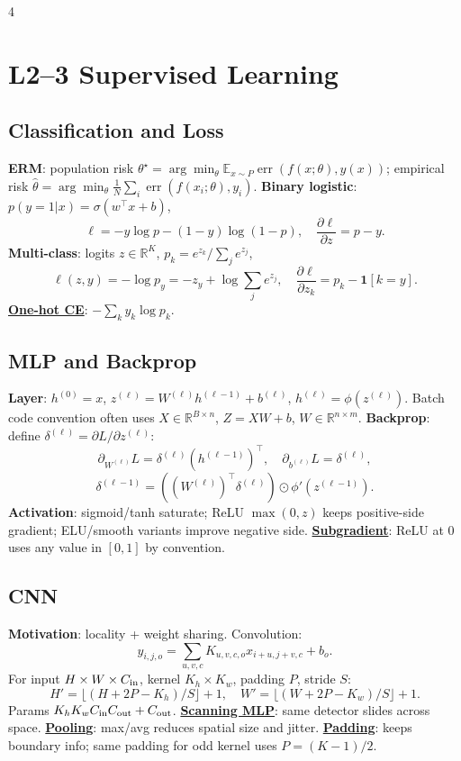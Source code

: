\documentclass{article}
\newcommand{\key}[1]{\textbf{#1}}
\newcommand{\lowterm}[1]{\textbf{\underline{#1}}}
\newcommand{\R}{\mathbb{R}}
\newcommand{\E}{\mathbb{E}}
\newcommand{\1}{\mathbf 1}
\begin{document}
\tiny
\begin{multicols*}{4}

\section{L2--3 Supervised Learning}
\subsection{Classification and Loss}
\key{ERM}: population risk $\theta^\star=\arg\min_\theta\E_{x\sim P}\operatorname{err}(f(x;\theta),y(x))$; empirical risk $\hat\theta=\arg\min_\theta\frac1N\sum_i\operatorname{err}(f(x_i;\theta),y_i)$. \key{Binary logistic}: $p(y=1|x)=\sigma(w^\top x+b)$,
\[
\ell=-y\log p-(1-y)\log(1-p),\quad \frac{\partial\ell}{\partial z}=p-y.
\]
\key{Multi-class}: logits $z\in\R^K$, $p_k=e^{z_k}/\sum_j e^{z_j}$,
\[
\ell(z,y)=-\log p_y=-z_y+\log\sum_j e^{z_j},\quad
\frac{\partial\ell}{\partial z_k}=p_k-\1[k=y].
\]
\lowterm{One-hot CE}: $-\sum_k y_k\log p_k$.

\subsection{MLP and Backprop}
\key{Layer}: $h^{(0)}=x$, $z^{(\ell)}=W^{(\ell)}h^{(\ell-1)}+b^{(\ell)}$, $h^{(\ell)}=\phi(z^{(\ell)})$. Batch code convention often uses $X\in\R^{B\times n}$, $Z=XW+b$, $W\in\R^{n\times m}$.
\key{Backprop}: define $\delta^{(\ell)}=\partial L/\partial z^{(\ell)}$:
\[
\partial_{W^{(\ell)}}L=\delta^{(\ell)}(h^{(\ell-1)})^\top,\quad
\partial_{b^{(\ell)}}L=\delta^{(\ell)},
\]
\[
\delta^{(\ell-1)}=((W^{(\ell)})^\top\delta^{(\ell)})\odot\phi'(z^{(\ell-1)}).
\]
\key{Activation}: sigmoid/tanh saturate; ReLU $\max(0,z)$ keeps positive-side gradient; ELU/smooth variants improve negative side. \lowterm{Subgradient}: ReLU at $0$ uses any value in $[0,1]$ by convention.

\subsection{CNN}
\key{Motivation}: locality + weight sharing. Convolution:
\[
y_{i,j,o}=\sum_{u,v,c}K_{u,v,c,o}x_{i+u,j+v,c}+b_o.
\]
For input $H\times W\times C_{\rm in}$, kernel $K_h\times K_w$, padding $P$, stride $S$:
\[
H'=\lfloor(H+2P-K_h)/S\rfloor+1,\quad
W'=\lfloor(W+2P-K_w)/S\rfloor+1.
\]
Params $K_hK_wC_{\rm in}C_{\rm out}+C_{\rm out}$. \lowterm{Scanning MLP}: same detector slides across space. \lowterm{Pooling}: max/avg reduces spatial size and jitter. \lowterm{Padding}: keeps boundary info; same padding for odd kernel uses $P=(K-1)/2$.


\end{multicols*}
\end{document}
